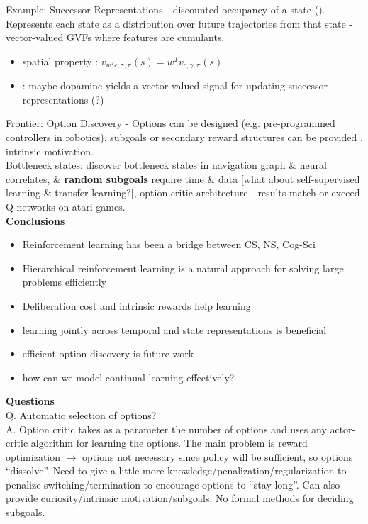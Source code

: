 \documentclass[12pt]{article}
\begin{document}
Example: Successor Representations - discounted occupancy of a state (\cite{Dayan93, Barreto16}). Represents each state as a distribution over future trajectories from that state - vector-valued GVFs where features are cumulants. 
\begin{itemize}
\item spatial property \cite{Barreto16}: $v_{w^Tc,\gamma,\pi}(s) = w^Tv_{c,\gamma,\pi}(s)$
\item \cite{Gardner2018}: maybe dopamine yields a vector-valued signal for updating successor representations (?)
\end{itemize}

Frontier: Option Discovery - Options can be designed (e.g. pre-programmed controllers in robotics), subgoals or secondary reward structures can be provided \cite{Sutton98}, intrinsic motivation. \\

Bottleneck states: \cite{Solway2014} discover bottleneck states in navigation graph \& neural correlates, \& \textbf{random subgoals} require time \& data \cite{mann15} [what about self-supervised learning \& transfer-learning?], option-critic architecture \cite{BaconHP16} - results match or exceed Q-networks on atari games. \\

\textbf{Conclusions}
\begin{itemize}
    \item Reinforcement learning has been a bridge between CS, NS, Cog-Sci
    \item Hierarchical reinforcement learning is a natural approach for solving large problems efficiently
    \item Deliberation cost and intrinsic rewards help learning
    \item learning jointly across temporal and state representations is beneficial \cite{Franklin2018}
    \item efficient option discovery is future work
    \item how can we model continual learning effectively?
\end{itemize}

\textbf{Questions} \\

Q. Automatic selection of options? \\

A. Option critic takes as a parameter the number of options and uses any actor-critic algorithm for learning the options. The main problem is reward optimization $\rightarrow$ options not necessary since policy will be sufficient, so options ``dissolve''. Need to give a little more knowledge/penalization/regularization to penalize switching/termination to encourage options to ``stay long''. Can also provide curiosity/intrinsic motivation/subgoals. No formal methods for deciding subgoals. \\
\end{document}
